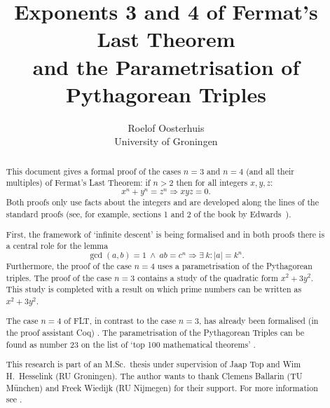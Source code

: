 \documentclass[11pt,a4paper,twoside]{article}
\begin{document}
\title{Exponents 3 and 4 of Fermat's Last Theorem \\ and the Parametrisation of Pythagorean Triples}
\author{Roelof Oosterhuis\\University of Groningen}
\maketitle

\begin{abstract}
This document gives a formal proof of the cases $n=3$ and $n=4$ (and
all their multiples) of Fermat's Last Theorem: if $n>2$ then for all
integers $x,y,z$:
\[ x^n + y^n = z^n \Longrightarrow xyz=0.\]
Both proofs only use facts about the integers and are developed along
the lines of the standard proofs (see, for example, sections 1 and 2
of the book by Edwards~\cite{Edwards}).

First, the framework of `infinite descent' is being formalised and in
both proofs there is a central role for the lemma
\[ \gcd(a,b)=1 ~\land~ ab=c^n \Longrightarrow \exists ~k: |a| =k^n. \]
Furthermore, the proof of the case $n=4$ uses a parametrisation of the
Pythagorean triples. The proof of the case $n=3$ contains a study of
the quadratic form $x^2 + 3y^2$. This study is completed with a result
on which prime numbers can be written as $x^2+3y^2$.

The case $n=4$ of FLT, in contrast to the case $n=3$, has already been
formalised (in the proof assistant Coq) \cite{DelahayeM}. The
parametrisation of the Pythagorean Triples can be found as number 23
on the list of `top 100 mathematical theorems' \cite{Wiedijk100}.

This research is part of an M.Sc.~thesis under supervision of Jaap Top
and Wim H.~Hesselink (RU Groningen). The author wants to thank Clemens
Ballarin (TU M\"unchen) and Freek Wiedijk (RU Nijmegen) for their
support. For more information see \cite{Oosterhuis-MSc}.
\end{abstract}
\thispagestyle{empty}
\clearpage

\tableofcontents
{}

\clearpage





\end{document}

